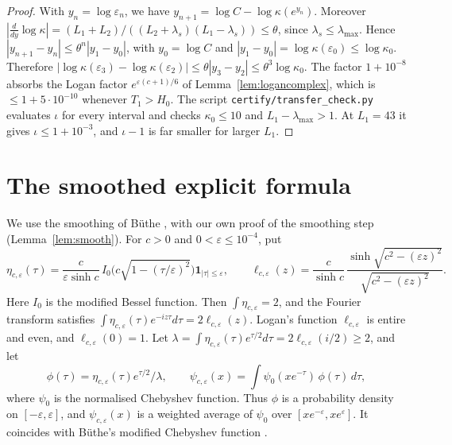 \documentclass[11pt]{amsart}
\numberwithin{equation}{section}
\theoremstyle{definition}
\theoremstyle{remark}
\newcommand{\eps}{\varepsilon}
\newcommand{\code}[1]{\texttt{#1}}
\begin{document}
\begin{proof}
With $y_n = \log\eps_n$, we have $y_{n+1} = \log C - \log\kappa(e^{y_n})$.
Moreover $|\frac{d}{dy}\log\kappa| = (L_1+L_2)/((L_2+\lambda_s)(L_1-\lambda_s)) \le \theta$, since $\lambda_s\le\lambda_{\max}$.
Hence $|y_{n+1} - y_n| \le \theta^n|y_1 - y_0|$, with $y_0 = \log C$ and $|y_1 - y_0| = \log\kappa(\eps_0) \le \log\kappa_0$.
Therefore $|\log\kappa(\eps_3) - \log\kappa(\eps_2)| \le \theta|y_3 - y_2| \le \theta^3\log\kappa_0$.
The factor $1+10^{-8}$ absorbs the Logan factor $e^{\eps(c+1)/6}$ of Lemma~\ref{lem:logancomplex}, which is $\le 1 + 5\cdot10^{-10}$ whenever $T_1 > H_0$.
The script \code{certify/transfer\_check.py} evaluates $\iota$ for every interval and checks $\kappa_0 \le 10$ and $L_1 - \lambda_{\max} > 1$.
At $L_1 = 43$ it gives $\iota \le 1 + 10^{-3}$, and $\iota - 1$ is far smaller for larger $L_1$.
\end{proof}
\section{The smoothed explicit formula}\label{sec:explicit}

We use the smoothing of B\"uthe \cite{Buthe2016}, with our own proof of the smoothing step (Lemma~\ref{lem:smooth}).
For $c > 0$ and $0 < \eps \le 10^{-4}$, put
\[
\eta_{c,\eps}(\tau) = \frac{c}{\eps\sinh c}\, I_0\!\Big(c\sqrt{1 - (\tau/\eps)^2}\Big)\mathbf 1_{|\tau|\le\eps},
\qquad
\ell_{c,\eps}(z) = \frac{c}{\sinh c}\,\frac{\sinh\sqrt{c^2 - (\eps z)^2}}{\sqrt{c^2-(\eps z)^2}} .
\]
Here $I_0$ is the modified Bessel function.
Then $\int\eta_{c,\eps} = 2$, and the Fourier transform satisfies $\int \eta_{c,\eps}(\tau)e^{-i z\tau}d\tau = 2\ell_{c,\eps}(z)$.
Logan's function $\ell_{c,\eps}$ is entire and even, and $\ell_{c,\eps}(0) = 1$.
Let $\lambda = \int\eta_{c,\eps}(\tau)e^{\tau/2}d\tau = 2\ell_{c,\eps}(i/2) \ge 2$, and let
\begin{equation}\label{eq:phi}
\phi(\tau) = \eta_{c,\eps}(\tau)e^{\tau/2}/\lambda, \qquad \psi_{c,\eps}(x) = \int \psi_0(xe^{-\tau})\,\phi(\tau)\,d\tau,
\end{equation}
where $\psi_0$ is the normalised Chebyshev function.
Thus $\phi$ is a probability density on $[-\eps,\eps]$, and $\psi_{c,\eps}(x)$ is a weighted average of $\psi_0$ over $[xe^{-\eps}, xe^{\eps}]$.
It coincides with B\"uthe's modified Chebyshev function \cite[(3.2)--(3.4)]{Buthe2018}.
\end{document}
